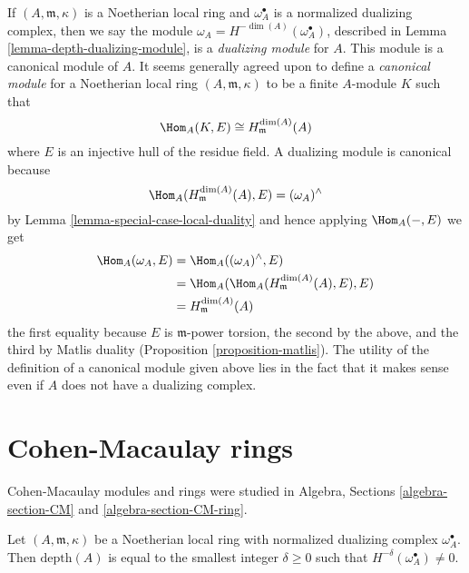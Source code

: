 \noindent
If $(A, \mathfrak m, \kappa)$ is a Noetherian local ring and
$\omega_A^\bullet$ is a normalized dualizing complex, then
we say the module $\omega_A = H^{-\dim(A)}(\omega_A^\bullet)$, described
in Lemma \ref{lemma-depth-dualizing-module},
is a {\it dualizing module}
for $A$. This module is a canonical module of $A$.
It seems generally agreed upon to define a {\it canonical module}
for a Noetherian local ring $(A, \mathfrak m, \kappa)$ to be
a finite $A$-module $K$ such that
$$
\Hom_A(K, E) \cong H^{\dim(A)}_\mathfrak m(A)
$$
where $E$ is an injective hull of the residue field. A dualizing
module is canonical because
$$
\Hom_A(H^{\dim(A)}_\mathfrak m(A), E) = (\omega_A)^\wedge
$$
by Lemma \ref{lemma-special-case-local-duality}
and hence applying
$\Hom_A(-, E)$ we get
\begin{align*}
\Hom_A(\omega_A, E)
& =
\Hom_A((\omega_A)^\wedge, E) \\
& =
\Hom_A(\Hom_A(H^{\dim(A)}_\mathfrak m(A), E), E) \\
& = H^{\dim(A)}_\mathfrak m(A)
\end{align*}
the first equality because $E$ is $\mathfrak m$-power torsion, the
second by the above, and the third by Matlis duality
(Proposition \ref{proposition-matlis}).
The utility of the definition
of a canonical module given above lies in the fact that it makes sense
even if $A$ does not have a dualizing complex.




\section{Cohen-Macaulay rings}
\label{section-CM}

\noindent
Cohen-Macaulay modules and rings were studied in
Algebra, Sections \ref{algebra-section-CM} and \ref{algebra-section-CM-ring}.

\begin{lemma}
\label{lemma-depth-in-terms-dualizing-complex}
Let $(A, \mathfrak m, \kappa)$ be a Noetherian local ring with
normalized dualizing complex $\omega_A^\bullet$.
Then $\text{depth}(A)$ is equal to the smallest integer $\delta \geq 0$
such that $H^{-\delta}(\omega_A^\bullet) \not = 0$.
\end{lemma}

